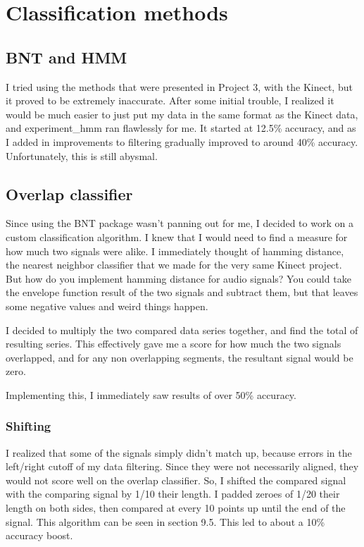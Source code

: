 \documentclass[12pt]{article}
\begin{document}
\FloatBarrier

\section{Classification methods}


\subsection{BNT and HMM}
I tried using the methods that were presented in Project 3, with the Kinect, but it proved to be extremely inaccurate. After some initial trouble, I realized it would be much easier to just put my data in the same format as the Kinect data, and experiment\_hmm ran flawlessly for me. It started at 12.5\% accuracy, and as I added in improvements to filtering gradually improved to around 40\% accuracy. Unfortunately, this is still abysmal.

\subsection{Overlap classifier}

Since using the BNT package wasn't panning out for me, I decided to work on a custom classification algorithm. I knew that I would need to find a measure for how much two signals were alike. I immediately thought of hamming distance, the nearest neighbor classifier that we made for the very same Kinect project. But how do you implement hamming distance for audio signals? You could take the envelope function result of the two signals and subtract them, but that leaves some negative values and weird things happen.

I decided to multiply the two compared data series together, and find the total of resulting series. This effectively gave me a score for how much the two signals overlapped, and for any non overlapping segments, the resultant signal would be zero.

Implementing this, I immediately saw results of over 50\% accuracy.

\subsubsection{Shifting}
I realized that some of the signals simply didn't match up, because errors in the left/right cutoff of my data filtering. Since they were not necessarily aligned, they would not score well on the overlap classifier. So, I shifted the compared signal with the comparing signal by 1/10 their length. I padded zeroes of 1/20 their length on both sides, then compared at every 10 points up until the end of the signal. This algorithm can be seen in section 9.5. This led to about a 10\% accuracy boost.
\end{document}
